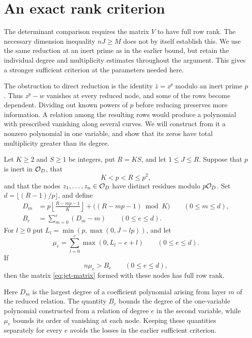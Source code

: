\section{An exact rank criterion}\label{sec:rank}
The determinant comparison requires the matrix $V$ to have full row rank.
The necessary dimension inequality $nJ\geq M$ does not by itself establish
this. We use the same reduction at an inert prime as in the earlier bound,
but retain the individual degree and multiplicity estimates throughout the
argument. This gives a stronger sufficient criterion at the parameters needed
here.

The obstruction to direct reduction is the identity
$\bar z=z^p$ modulo an inert prime $p$. Thus $z^p-w$ vanishes at every
reduced node, and some of the rows become dependent. Dividing out known
powers of $p$ before reducing preserves more information. A relation among
the resulting rows would produce a polynomial with prescribed vanishing
along several curves. We will construct from it a nonzero polynomial in
one variable, and show that its zeros have total multiplicity greater than
its degree.

\begin{theorem}\label{thm:exact-rank}
Let $K\geq2$ and $S\geq1$ be integers, put $R=KS$, and let $1\leq J\leq R$.
Suppose that $p$ is inert in $\mathcal O_D$, that
\[
 K<p<R\leq p^2,
\]
and that the nodes $z_1,\ldots,z_n\in\mathcal O_D$ have distinct residues modulo
$p\mathcal O_D$.
Set $d=\lfloor(R-1)/p\rfloor$, and define
\begin{equation}\label{eq:rank-caps}
 \begin{split}
 D_m&=p\left\lfloor\frac{R-mp-1}{K}\right\rfloor
             +\bigl((R-mp-1)\bmod K\bigr)\qquad(0\leq m\leq d),\\
 B_e&=\sum_{m=0}^e(D_m-m)\qquad(0\leq e\leq d).
 \end{split}
\end{equation}
For $l\geq0$ put $L_l=\min(p,\max(0,J-lp))$, and let
\begin{equation}\label{eq:rank-multiplicity}
 \mu_e=\sum_{l=0}^e\max(0,L_l-e+l)\qquad(0\leq e\leq d).
\end{equation}
If
\begin{equation}\label{eq:exact-rank-ineq}
 n\mu_e>B_e\qquad(0\leq e\leq d),
\end{equation}
then the matrix \eqref{eq:jet-matrix} formed with these nodes has full
row rank.
\end{theorem}

Here $D_m$ is the largest degree of a coefficient polynomial arising from
layer $m$ of the reduced relation. The quantity $B_e$ bounds the degree of
the one-variable polynomial constructed from a relation of degree $e$ in
the second variable, while $\mu_e$ bounds its order of vanishing at each
node. Keeping these quantities separately for every $e$ avoids the losses
in the earlier sufficient criterion.

